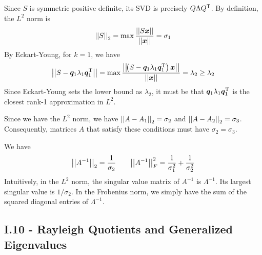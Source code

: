 \documentclass[a4paper]{article}
\begin{document}
\vspace{12pt}


Since \(S\) is symmetric positive definite, its SVD is precisely \(Q \Lambda Q^{\textsc{T}}\). By definition, the \(L^{2}\) norm is
\[
	\abs{\abs{S}}_{2} = \max \frac{\abs{\abs{S \bm{x}}}}{\abs{\abs{\bm{x}}}} = \sigma_{1}
\]
By Eckart-Young, for \(k = 1\), we have
\[
	\abs{\abs{S - \bm{q}_{1}\lambda_{1}\bm{q}_{1}^{\textsc{T}}}} = \max \frac{\abs{\abs{\!\left( S - \bm{q}_{1}\lambda_{1}\bm{q}_{1}^{\textsc{T}} \right) \bm{x}}}}{\abs{\abs{\bm{x}}}} = \lambda_{2} \ge \lambda_{2}
\]
Since Eckart-Young sets the lower bound as \(\lambda_{2}\), it must be that \(\bm{q }_{1}\lambda_{1}\bm{q }_{1}^{\textsc{T}}\) is the closest rank-1 approximation in \(L^{2}\).

\vspace{12pt}



Since we have the \(L^{2}\) norm, we have \(\abs{\abs{A - A_{1}}}_{2} = \sigma_{2}\) and \(\abs{\abs{A - A_{2}}}_{2} = \sigma_{3}\). Consequently, matrices \(A\) that satisfy these conditions must have \(\sigma_{2} = \sigma_{3}\).

\vspace{12pt}



We have
\[
	\abs{\abs{A^{-1}}}_{2} = \frac{1}{\sigma_{2}} \qquad \abs{\abs{A^{-1}}}^{2}_{F} = \frac{1}{\sigma_{1}^{2}} + \frac{1}{\sigma_{2}^{2}}
\]
Intuitively, in the \(L^{2}\) norm, the singular value matrix of \(A^{-1}\) is \(\Lambda^{-1}\). Its largest singular value is \(1 / \sigma_{2}\). In the Frobenius norm, we simply have the sum of the squared diagonal entries of \(\Lambda^{-1}\).

\newpage
\subsection{\textsf{I.10 - Rayleigh Quotients and Generalized Eigenvalues}}
\end{document}
